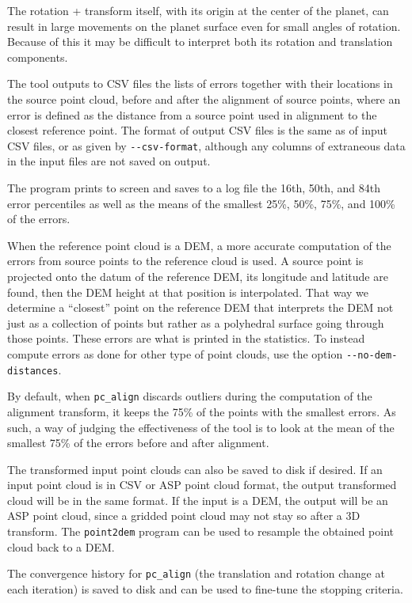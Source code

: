 The rotation + transform itself, with its origin at the center of the planet,
can result in large movements on the planet surface even for small angles
of rotation. Because of this it may be difficult to interpret both its rotation
and translation components.

The tool outputs to CSV files the lists of errors together with their
locations in the source point cloud, before and after the alignment of
source points, where an error is defined as the distance from a source
point used in alignment to the closest reference point. The format of
output CSV files is the same as of input CSV files, or as given by
\texttt{-\/-csv-format}, although any columns of extraneous data in the
input files are not saved on output.

The program prints to screen and saves to a log file the 16th, 50th, and
84th error percentiles as well as the means of the smallest 25\%, 50\%,
75\%, and 100\% of the errors.

When the reference point cloud is a DEM, a more accurate computation of
the errors from source points to the reference cloud is used. A source
point is projected onto the datum of the reference DEM, its longitude
and latitude are found, then the DEM height at that position is
interpolated.  That way we determine a ``closest'' point on the
reference DEM that interprets the DEM not just as a collection of points
but rather as a polyhedral surface going through those points. These
errors are what is printed in the statistics. To instead compute
errors as done for other type of point clouds, use the option
\texttt{-\/-no-dem-distances}.

By default, when \texttt{pc\_align} discards outliers during the
computation of the alignment transform, it keeps the 75\% of the points
with the smallest errors. As such, a way of judging the effectiveness of
the tool is to look at the mean of the smallest 75\% of the errors
before and after alignment.

The transformed input point clouds can also be saved to disk if
desired. If an input point cloud is in CSV or ASP point cloud format,
the output transformed cloud will be in the same format. If the input is
a DEM, the output will be an ASP point cloud, since a gridded point
cloud may not stay so after a 3D transform. The \texttt{point2dem}
program can be used to resample the obtained point cloud back to a DEM.

The convergence history for \texttt{pc\_align} (the translation and
rotation change at each iteration) is saved to disk and can be used to
fine-tune the stopping criteria.

